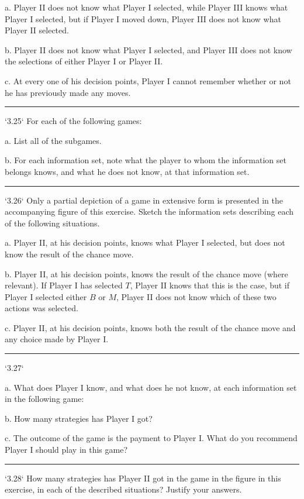 \documentclass[10pt]{report}
\begin{document}
		a. Player II does not know what Player I selected, while Player III knows what Player I selected, but if Player I moved down, Player III does not know what Player II selected.

		b. Player II does not know what Player I selected, and Player III does not know the selections of either Player I or Player II.

		c. At every one of his decision points, Player I cannot remember whether or not he has previously made any moves.

		\vspace{0.5cm}
		\hrule
		\vspace{0.5cm}
		`3.25` For each of the following games:

		a. List all of the subgames.

		b. For each information set, note what the player to whom the information set belongs knows, and what he does not know, at that information set.

		\vspace{0.5cm}
		\hrule
		\vspace{0.5cm}
		`3.26` Only a partial depiction of a game in extensive form is presented in the accompanying figure of this exercise. Sketch the information sets describing each of the following situations.

		a. Player II, at his decision points, knows what Player I selected, but does not know the result of the chance move.

		b. Player II, at his decision points, knows the result of the chance move (where relevant). If Player I has selected $T$, Player II knows that this is the case, but if Player I selected either $B$ or $M$, Player II does not know which of these two actions was selected.

		c. Player II, at his decision points, knows both the result of the chance move and any choice made by Player I.

		\vspace{0.5cm}
		\hrule
		\vspace{0.5cm}
		`3.27`

		a. What does Player I know, and what does he not know, at each information set in the following game:

		b. How many strategies has Player I got?

		c. The outcome of the game is the payment to Player I. What do you recommend Player I should play in this game?

		\vspace{0.5cm}
		\hrule
		\vspace{0.5cm}
		`3.28` How many strategies has Player II got in the game in the figure in this exercise, in each of the described situations? Justify your answers.
\end{document}
